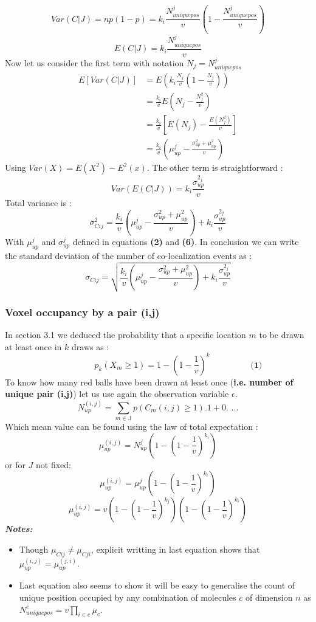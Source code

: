 \documentclass{article}
\begin{document}
\[
    Var(C|J) = np(1-p) = k_i \frac{N^j_{uniquepos}}{v}(1-\frac{N^j_{uniquepos}}{v})
\]
\[
    E(C|J) = k_i \frac{N^j_{uniquepos}}{v}
\]
Now let us consider the first term with notation $N_j = N^j_{uniquepos}$
\[
    \begin{split}
    E[Var(C|J)] &= E(k_i \frac{N_j}{v}(1-\frac{N_j}{v})) \\
    &= \frac{k_i}{v}E(N_j - \frac{N^2_j}{v}) \\
    &= \frac{k_i}{v}[E(N_j) - \frac{E(N^2_j)}{v}] \\
    &= \frac{k_i}{v}(\mu^j_{up} - \frac{\sigma^2_{up} + \mu^2_{up}}{v})
\end{split}
\]
Using $Var(X) = E(X^2) - E^2(x)$.\newline
The other term is straightforward : 
\[
Var(E(C|J)) = k_i\frac{\sigma^{2_j}_{up}}{v}
\]
Total variance is :
\[
    \sigma^2_{Cij} = \frac{k_i}{v}(\mu^j_{up} - \frac{\sigma^2_{up} + \mu^2_{up}}{v}) + k_i\frac{\sigma^{2_j}_{up}}{v}
\]
With $\mu^j_{up}$ and $\sigma^j_{up}$ defined in equations \textbf{(2)} and \textbf{(6)}.\newline
In conclusion we can write the standard deviation of the number of co-localization events as :
\begin{equation}
    \sigma_{Cij} = \sqrt{\frac{k_i}{v}(\mu^j_{up} - \frac{\sigma^2_{up} + \mu^2_{up}}{v}) + k_i\frac{\sigma^{2_j}_{up}}{v}}
\end{equation}




\subsubsection{Voxel occupancy by a pair (i,j)}
In section 3.1 we deduced the probability that a specific location $m$ to be drawn at least once  in $k$ draws as :
\[
    \hspace{2cm} p_k(X_m \geq 1) = 1-(1 - \frac{1}{v})^k \hspace{2cm} \textbf{(1)}
\]
To know how many red balls have been drawn at least once (\textbf{i.e. number of unique pair (i,j)}) let us use again the observation
variable $\epsilon$.
\[
N^{(i,j)}_{up} = \sum_{m \in \mathbb{J}}p(C_m(i,j) \geq 1).1 + 0. \textbf{ ...}
\]
Which mean value can be found using the law of total expectation :
\begin{equation}
\mu^{(i,j)}_{up} = N^j_{up}(1-(1-\frac{1}{v})^{k_i})
\end{equation}
or for $J$ not fixed:
\[
\mu^{(i,j)}_{up} = \mu^j_{up}(1-(1-\frac{1}{v})^{k_i})
\]
\[
\mu^{(i,j)}_{up} = v(1-(1-\frac{1}{v})^{k_j})(1-(1-\frac{1}{v})^{k_i})
\]
\textit{\textbf{Notes:}}
\begin{itemize}
    \item Though $\mu_{Cij} \neq \mu_{Cji}$, explicit writting in last equation shows that \newline 
    $\mu^{(i,j)}_{up} = \mu^{(j,i)}_{up}$.
    \item Last equation also seems to show it will be easy to generalise the count of unique position occupied by any combination of molecules $c$ of dimension $n$
    as $N^c_{uniquepos} = v\prod_{i \in c}\mu_c$.
\end{itemize}
\end{document}
